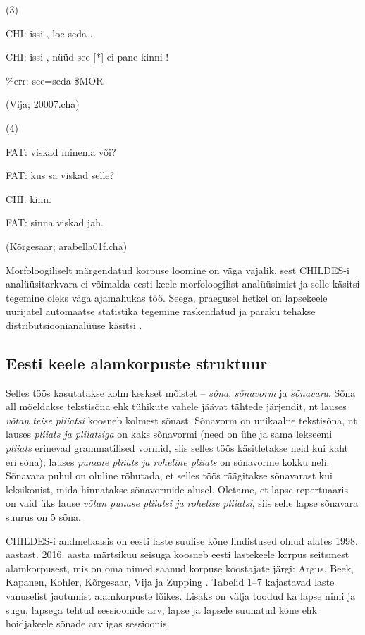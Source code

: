 \documentclass[12pt]{article}
\begin{document}
(3)
\begin{description}
    \item*CHI: issi , loe seda .
    \item*CHI: issi , nüüd see [*] ei pane kinni !
    \item\%err: see=seda \$MOR
    \item(Vija; 20007.cha)
\end{description}
\hfill

(4)
\begin{description}
    \item*FAT: viskad minema või?
    \item*FAT: kus sa viskad selle?
    \item*CHI: kinn.
    \item*FAT: sinna viskad jah.
    \item(Kõrgesaar; arabella01f.cha)
\end{description}
\hfill


Morfoloogiliselt märgendatud korpuse loomine on väga vajalik, sest CHILDES-i analüüsitarkvara ei võimalda eesti keele morfoloogilist analüüsimist ja selle käsitsi tegemine oleks väga ajamahukas töö. Seega, praegusel hetkel on lapsekeele uurijatel automaatse statistika tegemine raskendatud ja paraku tehakse distributsioonianalüüse käsitsi \citep[78]{Argus2007}.

\subsection{Eesti keele alamkorpuste struktuur}

 Selles töös kasutatakse kolm keskset mõistet -- \emph{sõna}, \emph{sõnavorm} ja \emph{sõnavara}. Sõna all mõeldakse tekstisõna ehk tühikute vahele jäävat tähtede järjendit, nt lauses \emph{võtan teise pliiatsi} koosneb kolmest sõnast. Sõnavorm on unikaalne tekstisõna, nt lauses \emph{pliiats ja pliiatsiga} on kaks sõnavormi (need on ühe ja sama lekseemi \emph{pliiats} erinevad grammatilised vormid, siis selles töös käsitletakse neid kui kaht eri sõna); lauses \emph{punane pliiats ja roheline pliiats} on sõnavorme kokku neli. Sõnavara puhul on oluline rõhutada, et selles töös räägitakse sõnavarast kui leksikonist, mida hinnatakse sõnavormide alusel. Oletame, et lapse repertuaaris on vaid üks lause \emph{võtan punase pliiatsi ja rohelise pliiatsi}, siis selle lapse sõnavara suurus on 5 sõna.

CHILDES-i andmebaasis on eesti laste suulise kõne lindistused olnud alates 1998. aastast. 2016. aasta märtsikuu seisuga koosneb eesti lastekeele korpus seitsmest alamkorpusest, mis on oma nimed saanud korpuse koostajate järgi: Argus, Beek, Kapanen, Kohler, Kõrgesaar, Vija ja Zupping \citep{CHILDES}. Tabelid 1--7 kajastavad laste vanuselist jaotumist alamkorpuste lõikes. Lisaks on välja toodud ka lapse nimi ja sugu, lapsega tehtud sessioonide arv, lapse ja lapsele suunatud kõne ehk hoidjakeele sõnade arv igas sessioonis.
\end{document}
